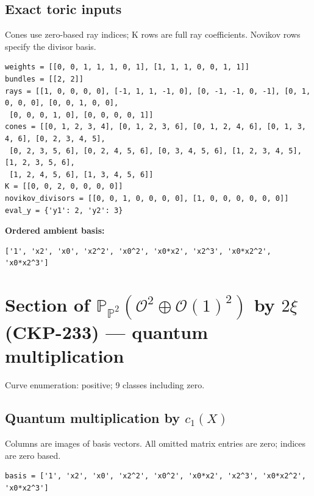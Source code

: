 \documentclass[10pt,a4paper]{article}
\begin{document}
\subsection*{Exact toric inputs}
Cones use zero-based ray indices; K rows are full ray coefficients. Novikov rows specify the divisor basis.

\begin{lstlisting}
weights = [[0, 0, 1, 1, 1, 0, 1], [1, 1, 1, 0, 0, 1, 1]]
bundles = [[2, 2]]
rays = [[1, 0, 0, 0, 0], [-1, 1, 1, -1, 0], [0, -1, -1, 0, -1], [0, 1, 0, 0, 0], [0, 0, 1, 0, 0],
 [0, 0, 0, 1, 0], [0, 0, 0, 0, 1]]
cones = [[0, 1, 2, 3, 4], [0, 1, 2, 3, 6], [0, 1, 2, 4, 6], [0, 1, 3, 4, 6], [0, 2, 3, 4, 5],
 [0, 2, 3, 5, 6], [0, 2, 4, 5, 6], [0, 3, 4, 5, 6], [1, 2, 3, 4, 5], [1, 2, 3, 5, 6],
 [1, 2, 4, 5, 6], [1, 3, 4, 5, 6]]
K = [[0, 0, 2, 0, 0, 0, 0]]
novikov_divisors = [[0, 0, 1, 0, 0, 0, 0], [1, 0, 0, 0, 0, 0, 0]]
eval_y = {'y1': 2, 'y2': 3}
\end{lstlisting}

\textbf{Ordered ambient basis:}
\begin{lstlisting}
['1', 'x2', 'x0', 'x2^2', 'x0^2', 'x0*x2', 'x2^3', 'x0*x2^2', 'x0*x2^3']
\end{lstlisting}

\clearpage\section*{Section of $\mathbb P_{\mathbb P^{2}}(\mathcal O^{2}\oplus \mathcal O(1)^{2})$ by $2\xi $ (CKP-233) --- quantum multiplication}

Curve enumeration: positive; 9 classes including zero.
\subsection*{Quantum multiplication by $c_1(X)$}
Columns are images of basis vectors. All omitted matrix entries are zero; indices are zero based.

\begin{lstlisting}
basis = ['1', 'x2', 'x0', 'x2^2', 'x0^2', 'x0*x2', 'x2^3', 'x0*x2^2', 'x0*x2^3']
\end{lstlisting}
\end{document}
